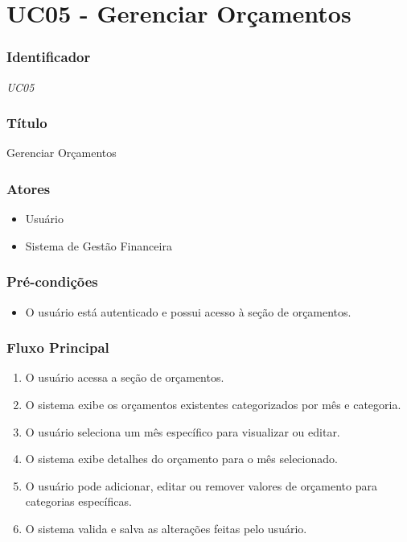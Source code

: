 \chapter{UC05 - Gerenciar Orçamentos}
\label{apendiceUC05}

\subsection*{Identificador}
\textit{UC05}

\subsection*{Título}
Gerenciar Orçamentos

\subsection*{Atores}
\begin{addmargin}[1.5cm]{0cm}
	\begin{itemize}
		\item Usuário
		\item Sistema de Gestão Financeira
	\end{itemize}
\end{addmargin}

\subsection*{Pré-condições}
\begin{addmargin}[1.5cm]{0cm}
	\begin{itemize}
		\item O usuário está autenticado e possui acesso à seção de orçamentos.
	\end{itemize}
\end{addmargin}

\subsection*{Fluxo Principal}
\begin{addmargin}[1.5cm]{0cm}
	\begin{enumerate}
		\item O usuário acessa a seção de orçamentos.
		\item O sistema exibe os orçamentos existentes categorizados por mês e categoria.
		\item O usuário seleciona um mês específico para visualizar ou editar.
		\item O sistema exibe detalhes do orçamento para o mês selecionado.
		\item O usuário pode adicionar, editar ou remover valores de orçamento para categorias específicas.
		\item O sistema valida e salva as alterações feitas pelo usuário.
	\end{enumerate}
\end{addmargin}

